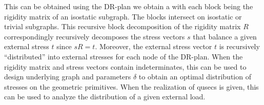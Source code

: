 \medskip\noindent
{}
This can be obtained using the DR-plan we obtain a
with each block being the
rigidity matrix of an isostatic subgraph. The blocks intersect on
isostatic or trivial subgraphs. This recursive block decomposition of
the rigidity matrix $R$ correspondingly recursively decomposes
the stress vectors $s$ that balance a given external stress $t$ since
$sR = t$. Moreover, the external stress vector $t$ is
recursively ``distributed'' into external stresses for each
node of the DR-plan.
When the rigidity matrix and stress
vectors contain indeterminates, this  can be used to design
underlying graph and parameters $\delta$ to obtain an optimal
distribution of stresses on the geometric primitives. When the
realization of qusecs is given, this can be used to analyze the
distribution of a given external load.




